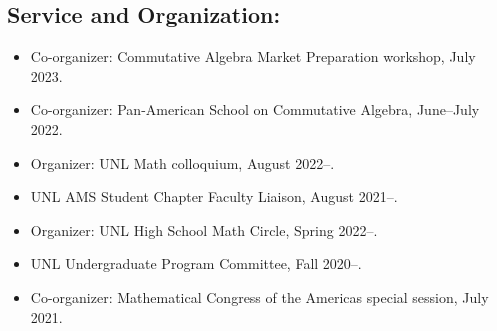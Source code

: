 \documentclass[12pt]{amsart}
\begin{document}
\subsection*{Service and Organization:}
\begin{itemize}[leftmargin=9mm]
	\item Co-organizer: Commutative Algebra Market Preparation workshop, July 2023.
	\item Co-organizer: Pan-American School on Commutative Algebra, June--July 2022.
	\item Organizer: UNL Math colloquium, August 2022--.
	\item UNL AMS Student Chapter Faculty Liaison, August 2021--.
		\item Organizer: UNL High School Math Circle, Spring 2022--.

	\item UNL Undergraduate Program Committee, Fall 2020--.
		\item Co-organizer: Mathematical Congress of the Americas special session, July 2021.



\end{itemize}
\end{document}
